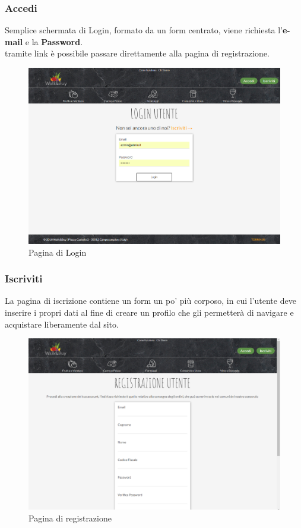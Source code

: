 \subsubsection{Accedi}
Semplice schermata di Login, formato da un form centrato, viene richiesta l'\textbf{e-mail} e la \textbf{Password}.\\
tramite link è possibile passare direttamente alla pagina di registrazione.
\begin{figure}[H]
	\includegraphics[width=\linewidth]{res/img/login}
	\caption{Pagina di Login}
	\label{Pagina di Login}
\end{figure}

\subsubsection{Iscriviti}
La pagina di iscrizione contiene un form un po' più corposo, in cui l'utente deve inserire i propri dati al fine di creare un profilo che gli permetterà di navigare e acquistare liberamente dal sito.
\begin{figure}[H]
	\includegraphics[width=\linewidth]{res/img/registrazione}
	\caption{Pagina di registrazione}
	\label{Pagina di registrazione}
\end{figure}
